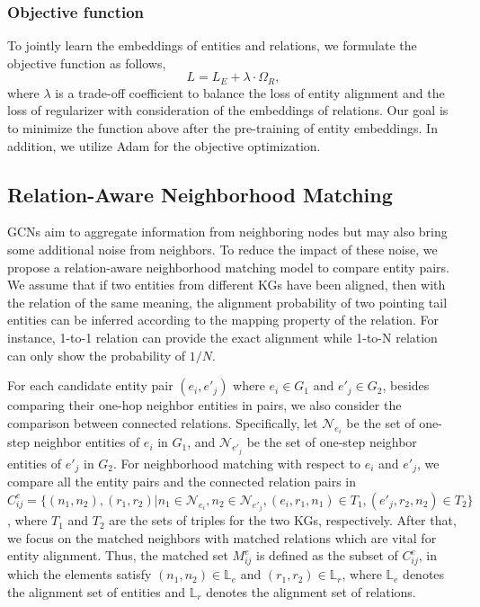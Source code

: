 \documentclass[letterpaper]{article} %
\begin{document}
\subsubsection{Objective function}
To jointly learn the embeddings of entities and relations, we
formulate the objective function as follows,
\begin{equation}
L = L_E + \lambda \cdot \Omega_R, \label{loss_all}
\end{equation}
where $\lambda$ is a trade-off coefficient to balance the loss of
entity alignment and the loss of regularizer with consideration of
the embeddings of relations. Our goal is to minimize the function
above after the pre-training of entity embeddings. In addition, we
utilize Adam \cite{kingma2015adam} for the objective optimization.


\subsection{Relation-Aware Neighborhood Matching}

GCNs aim to aggregate information from neighboring nodes but may
also bring some additional noise from neighbors. To reduce the
impact of these noise, we propose a relation-aware neighborhood
matching model to compare entity pairs. We assume that if two
entities from different KGs have been aligned, then with the
relation of the same meaning, the alignment probability of two
pointing tail entities can be inferred according to the mapping
property of the relation. For instance, 1-to-1 relation can provide
the exact alignment while 1-to-N relation can only show the
probability of $1/N$.


For each candidate entity pair $(e_i, e'_j)$ where $e_i \in G_1$ and
$e'_j \in G_2$, besides comparing their one-hop neighbor entities in
pairs, we also consider the comparison between connected relations.
Specifically, let $\mathcal{N}_{e_i}$ be the set of one-step
neighbor entities of $e_i$ in $G_1$, and $\mathcal{N}_{e'_j}$ be the
set of one-step neighbor entities of $e'_j$ in $G_2$. For
neighborhood matching with respect to $e_i$ and $e'_j$, we compare
all the entity pairs and the connected relation pairs in $C^e_{ij} =
\{ (n_1,n_2), (r_1,r_2) | n_1 \in \mathcal{N}_{e_i}, n_2 \in
\mathcal{N}_{e'_j}, (e_i, r_1, n_1) \in T_1, (e'_j, r_2, n_2) \in
T_2 \}$, where $T_1$ and $T_2$ are the sets of triples for the two
KGs, respectively. After that, we focus on the matched neighbors
with matched relations which are vital for entity alignment. Thus,
the matched set $M^e_{ij}$ is defined as the subset of $C^e_{ij}$,
in which the elements satisfy $(n_1,n_2) \in \mathbb{L}_e$ and
$(r_1,r_2) \in \mathbb{L}_r$, where $\mathbb{L}_e$ denotes the
alignment set of entities and $\mathbb{L}_r$ denotes the
alignment set of relations.
\end{document}
